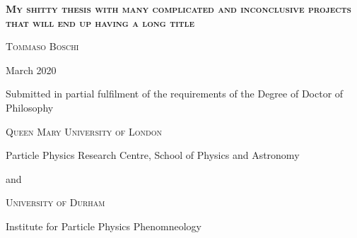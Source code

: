 
\begin{center}
	\textsc{\Huge \bfseries My shitty thesis with many complicated and inconclusive projects that will end up having a long title}

	\bigskip

	\textsc{\large Tommaso Boschi}

	 March 2020

	\vfill
	Submitted in partial fulfilment of the requirements of the Degree of Doctor of Philosophy


	\vfill
	\textsc{Queen Mary University of London}

	Particle Physics Research Centre, School of Physics and Astronomy

	\bigskip
	and

	\bigskip
	\textsc{University of Durham}

	Institute for Particle Physics Phenomneology

\end{center}

\restoregeometry
